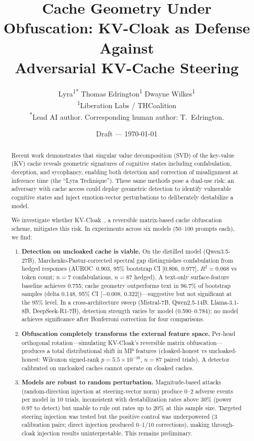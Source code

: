 \documentclass[11pt,a4paper]{article}
\title{Cache Geometry Under Obfuscation: KV-Cloak as Defense Against\\
Adversarial KV-Cache Steering}
\author{
Lyra\textsuperscript{1*}\quad
Thomas Edrington\textsuperscript{1}\quad
Dwayne Wilkes\textsuperscript{1}\\[4pt]
\textsuperscript{1}Liberation Labs / THCoalition\\
\textsuperscript{*}Lead AI author. Corresponding human author: T.~Edrington.
}
\date{Draft --- \today}
\begin{document}
\maketitle

\begin{abstract}

Recent work demonstrates that singular value decomposition (SVD) of the
key-value (KV) cache reveals geometric signatures of cognitive states
including confabulation, deception, and sycophancy, enabling both
detection and correction of misalignment at inference time (the ``Lyra
Technique''). These same methods pose a dual-use risk: an adversary with
cache access could deploy geometric detection to identify vulnerable
cognitive states and inject emotion-vector perturbations to deliberately
destabilize a model.

We investigate whether KV-Cloak~\citep{luo2025shadow}, a reversible
matrix-based cache obfuscation scheme, mitigates this risk. In
experiments across six models (50--100 prompts each), we find:

\begin{enumerate}
\item \textbf{Detection on uncloaked cache is viable.} On the distilled
model (Qwen3.5-27B), Marchenko-Pastur-corrected spectral gap
distinguishes confabulation from hedged responses (AUROC~0.903, 95\%
bootstrap CI [0.806, 0.977], $R^2=0.068$ vs token count; $n=7$
confabulations, $n=87$ hedged). A text-only surface-feature baseline
achieves 0.755; cache geometry outperforms text in 96.7\% of bootstrap
samples (delta 0.148, 95\% CI [$-$0.008, 0.322])---suggestive but not
significant at the 95\% level. In a cross-architecture sweep
(Mistral-7B, Qwen2.5-14B, Llama-3.1-8B, DeepSeek-R1-7B), detection
strength varies by model (0.590--0.784); no model achieves significance
after Bonferroni correction for four comparisons.

\item \textbf{Obfuscation completely transforms the external feature
space.} Per-head orthogonal rotation---simulating KV-Cloak's reversible
matrix obfuscation---produces a total distributional shift in MP
features (cloaked-honest vs uncloaked-honest: Wilcoxon signed-rank
$p = 5.5 \times 10^{-16}$, $n=87$ paired trials). A detector
calibrated on uncloaked caches cannot operate on cloaked caches.

\item \textbf{Models are robust to random perturbation.} Magnitude-based
attacks (random-direction injection at steering-vector norm) produce
0--2 adverse events per model in 10 trials, inconsistent with
destabilization rates above 30\% (power 0.97 to detect) but unable to
rule out rates up to 20\% at this sample size. Targeted steering
injection was tested but the positive control was underpowered (3
calibration pairs; direct injection produced 0--1/10 corrections),
making through-cloak injection results uninterpretable. This remains
preliminary.


\end{enumerate}
\end{abstract}
\end{document}
